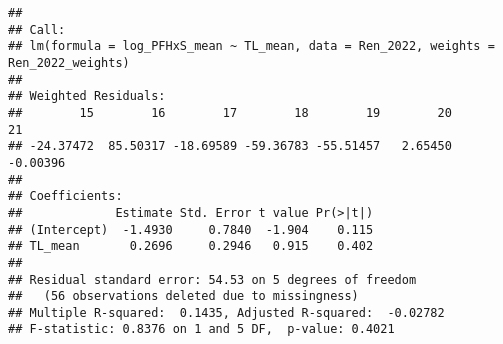 \documentclass[
]{article}
\newenvironment{Shaded}{\begin{snugshade}}{\end{snugshade}}
\newcommand{\AttributeTok}[1]{\textcolor[rgb]{0.13,0.29,0.53}{#1}}
\newcommand{\CommentTok}[1]{\textcolor[rgb]{0.56,0.35,0.01}{\textit{#1}}}
\newcommand{\DecValTok}[1]{\textcolor[rgb]{0.00,0.00,0.81}{#1}}
\newcommand{\FunctionTok}[1]{\textcolor[rgb]{0.13,0.29,0.53}{\textbf{#1}}}
\newcommand{\NormalTok}[1]{#1}
\newcommand{\OtherTok}[1]{\textcolor[rgb]{0.56,0.35,0.01}{#1}}
\newcommand{\SpecialCharTok}[1]{\textcolor[rgb]{0.81,0.36,0.00}{\textbf{#1}}}
\newcommand{\StringTok}[1]{\textcolor[rgb]{0.31,0.60,0.02}{#1}}
\begin{document}
\begin{Shaded}
\end{Shaded}

\begin{verbatim}
## 
## Call:
## lm(formula = log_PFHxS_mean ~ TL_mean, data = Ren_2022, weights = Ren_2022_weights)
## 
## Weighted Residuals:
##        15        16        17        18        19        20        21 
## -24.37472  85.50317 -18.69589 -59.36783 -55.51457   2.65450  -0.00396 
## 
## Coefficients:
##             Estimate Std. Error t value Pr(>|t|)
## (Intercept)  -1.4930     0.7840  -1.904    0.115
## TL_mean       0.2696     0.2946   0.915    0.402
## 
## Residual standard error: 54.53 on 5 degrees of freedom
##   (56 observations deleted due to missingness)
## Multiple R-squared:  0.1435, Adjusted R-squared:  -0.02782 
## F-statistic: 0.8376 on 1 and 5 DF,  p-value: 0.4021
\end{verbatim}
\end{document}
